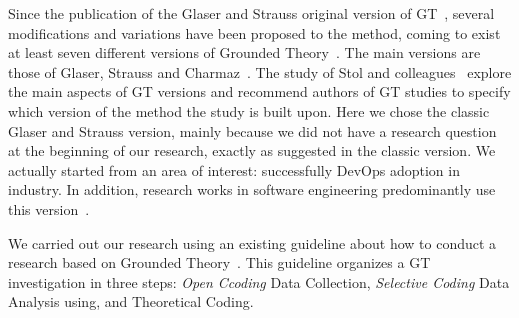 Since the publication of the Glaser and Strauss original version of GT~\cite{glase1967discovery},
several modifications and variations have been proposed to the method, coming to
exist at least seven different versions of Grounded Theory~\cite{denzin2007grounded}.
The main versions are those of Glaser, Strauss and
Charmaz~\cite{stol2016grounded}. The study of Stol and colleagues~\cite{stol2016grounded}
explore the main aspects of GT versions and recommend authors of GT studies to
specify which version of the method the study is built upon. Here we chose the classic
Glaser and Strauss version, mainly because we did not have a research
question at the beginning of our research, exactly as suggested in the classic
version. We actually started from an area of interest: successfully DevOps adoption
in industry. In addition, research works in
software engineering predominantly use this version~\cite{stol2016grounded}.





We carried out our research using an existing 
guideline about how to conduct a research based on 
Grounded Theory~\cite{adolph2011using}. This guideline organizes 
a GT investigation in three steps: \emph{Open Ccoding} Data Collection,  
\emph{Selective Coding} Data Analysis using, and Theoretical Coding. 
 


